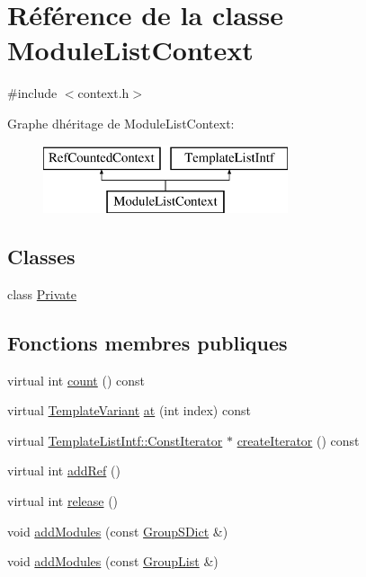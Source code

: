 \hypertarget{class_module_list_context}{}\section{Référence de la classe Module\+List\+Context}
\label{class_module_list_context}


{\ttfamily \#include $<$context.\+h$>$}

Graphe d\textquotesingle{}héritage de Module\+List\+Context\+:\begin{figure}[H]
\begin{center}
\leavevmode
\includegraphics[height=2.000000cm]{class_module_list_context}
\end{center}
\end{figure}
\subsection*{Classes}
\begin{DoxyCompactItemize}
\item 
class \hyperlink{class_module_list_context_1_1_private}{Private}
\end{DoxyCompactItemize}
\subsection*{Fonctions membres publiques}
\begin{DoxyCompactItemize}
\item 
virtual int \hyperlink{class_module_list_context_af0aa7fea7a0e804a59a2734cae684799}{count} () const 
\item 
virtual \hyperlink{class_template_variant}{Template\+Variant} \hyperlink{class_module_list_context_aae4694ac72a82c339432c5b27e65fccf}{at} (int index) const 
\item 
virtual \hyperlink{class_template_list_intf_1_1_const_iterator}{Template\+List\+Intf\+::\+Const\+Iterator} $\ast$ \hyperlink{class_module_list_context_a782e4372ee5e45244a1a71b9e47f88a7}{create\+Iterator} () const 
\item 
virtual int \hyperlink{class_module_list_context_a88f218226c4fc48cfa07d0e48568c4ce}{add\+Ref} ()
\item 
virtual int \hyperlink{class_module_list_context_a43785b9c64132a617e587d0181a5f4ae}{release} ()
\item 
void \hyperlink{class_module_list_context_a27cb73cdd510c5e432a8ebe3ceb3d30a}{add\+Modules} (const \hyperlink{class_group_s_dict}{Group\+S\+Dict} \&)
\item 
void \hyperlink{class_module_list_context_a94c78ad4a69fefc92435c334578a5dfe}{add\+Modules} (const \hyperlink{class_group_list}{Group\+List} \&)
\end{DoxyCompactItemize}
